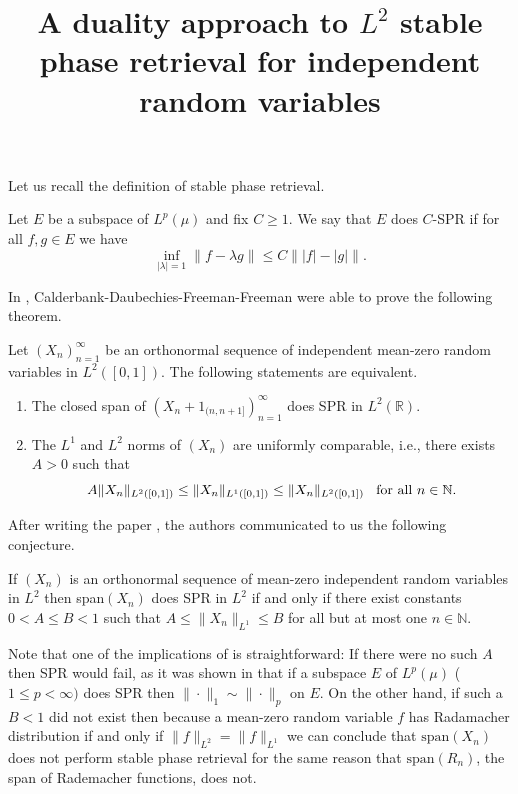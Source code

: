 \documentclass{inprogress}
\title{A duality approach to $L^2$ stable phase retrieval for independent random variables}
\begin{document}
\maketitle

Let us recall the definition of stable phase retrieval.
\begin{theorem}
    Let $E$ be a subspace of $L^p(\mu)$ and fix $C\geq 1$. We say that $E$ does $C$-SPR if for all $f,g\in E$ we have
    \begin{equation}\label{C-SPR}
        \inf_{|\lambda|=1}\|f-\lambda g\|\leq C \| |f|-|g|\|.
    \end{equation}
\end{theorem}


In \cite{calderbank2022stable},  Calderbank-Daubechies-Freeman-Freeman were able to prove the following theorem.

\begin{theorem}
 Let $(X_n)_{n=1}^\infty$ be an orthonormal sequence of independent mean-zero random variables in $L^2([0,1])$. The following statements are equivalent.
 \begin{enumerate}
\item The closed span of $(X_n+1_{(n,n+1]})_{n=1}^\infty$ does SPR in $L^2(\mathbb{R}).$
\item The $L^1$ and $L^2$ norms of $(X_n)$ are uniformly comparable, i.e., there exists $A>0$ such that $$A\|X_n\|_{L^2([0,1])}\leq \|X_n\|_{L^1([0,1])}\leq \|X_n\|_{L^2([0,1])}\hspace{3mm} \text{for all}\ n\in \mathbb{N}.$$
\end{enumerate}
\end{theorem}
After writing the paper \cite{calderbank2022stable}, the authors communicated to us the following conjecture.
\begin{conjecture}\label{conjecture CDFF}
    If $(X_n)$ is an orthonormal sequence of mean-zero independent random variables in $L^2$ then span$(X_n)$ does SPR in $L^2$ if and only if there exist constants $0<A\leq B<1$ such that $A\leq \|X_n\|_{L^1} \leq B$ for all but at most one $n\in \mathbb{N}$.
\end{conjecture}
Note that one of the implications of  is straightforward: If there were no such $A$ then SPR would fail, as it was shown in \cite{FOTP} that if a subspace $E$ of $L^p(\mu)$ ($1\leq p<\infty)$ does SPR then $\|\cdot\|_1\sim \|\cdot\|_p$ on $E$. On the other hand, if such a $B <1$ did not exist then because a mean-zero random variable $f$ has Radamacher distribution if and only if $\|f\|_{L^2}=\|f\|_{L^1}$ we can conclude that $\text{span} (X_n)$
does not perform stable phase retrieval for the same reason that $\text{span} (R_n)$, the span of Rademacher functions, does not.
\end{document}
